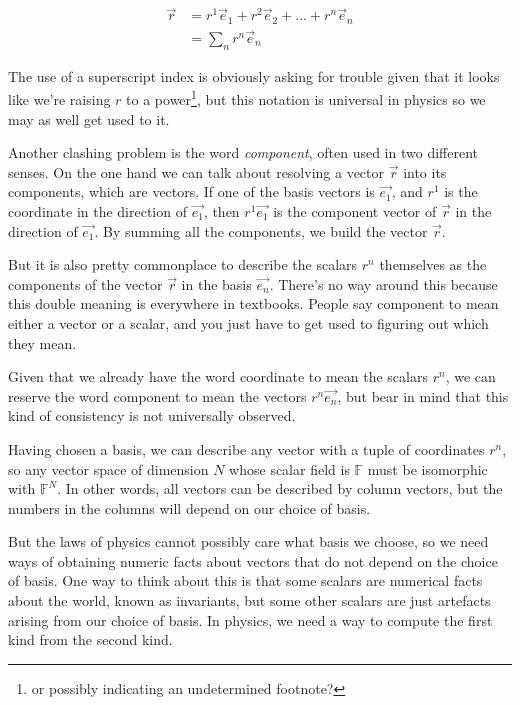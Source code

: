 \begin{equation}
\begin{split}
\vec{r} &= r^1 \vec{e}_1 + r^2 \vec{e}_2 + ... + r^n \vec{e}_n \\
        &= \sum_n r^n \vec{e}_n
\end{split}
\end{equation}

The use of a superscript index is obviously asking for trouble given that it looks like we're raising $r$ to a power\footnote{or possibly indicating an undetermined footnote?}, but this notation is universal in physics so we may as well get used to it.

Another clashing problem is the word \textit{component}, often used in two different senses. On the one hand we can talk about resolving a vector $\vec{r}$ into its components, which are vectors. If one of the basis vectors is $\vec{e_1}$, and $r^1$ is the coordinate in the direction of $\vec{e_1}$, then $r^1 \vec{e_1}$ is the component vector of $\vec{r}$ in the direction of $\vec{e_1}$. By summing all the components, we build the vector $\vec{r}$.

But it is also pretty commonplace to describe the scalars $r^n$ themselves as the components of the vector $\vec{r}$ in the basis $\vec{e_n}$. There's no way around this because this double meaning is everywhere in textbooks. People say component to mean either a vector or a scalar, and you just have to get used to figuring out which they mean.

Given that we already have the word coordinate to mean the scalars $r^n$, we can reserve the word component to mean the vectors $r^n \vec{e_n}$, but bear in mind that this kind of consistency is not universally observed.

Having chosen a basis, we can describe any vector with a tuple of coordinates $r^n$, so any vector space of dimension $N$ whose scalar field is $\mathbb{F}$ must be isomorphic with $\mathbb{F}^N$. In other words, all vectors can be described by column vectors, but the numbers in the columns will depend on our choice of basis.

But the laws of physics cannot possibly care what basis we choose, so we need ways of obtaining numeric facts about vectors that do not depend on the choice of basis. One way to think about this is that some scalars are numerical facts about the world, known as invariants, but some other scalars are just artefacts arising from our choice of basis. In physics, we need a way to compute the first kind from the second kind.

